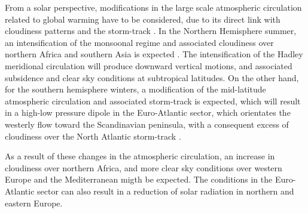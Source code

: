 From a solar perspective, modifications in the large scale atmospheric circulation related to global warming have to be considered, due to its direct link with cloudiness patterns and the storm-track \cite{Pozo-Vazquez2004, Chiacchio2010, Chiacchio2012}. In the Northern Hemisphere summer, an intensification of the monsoonal regime and associated cloudiness over northern Africa and southern Asia is expected \cite*{Gaetani2014}. The intensification of the Hadley meridional circulation  will produce downward vertical motions, and associated subsidence and clear sky conditions at subtropical latitudes. On the other hand, for the southern hemisphere winters, a modification of the mid-latitude atmospheric circulation and associated storm-track is expected, which will result in a high-low pressure dipole in the Euro-Atlantic sector, which orientates the westerly flow toward the Scandinavian peninsula, with a consequent excess of cloudiness over the North Atlantic storm-track \cite{Gaetani2014}.

As a result of these changes in the atmospheric circulation, an increase in cloudiness over northern Africa, and more clear sky conditions over western Europe and the Mediterranean \cite*{Gaetani2014} migth be expected. The conditions in the Euro-Atlantic sector can also result in a reduction of solar radiation in northern and eastern Europe.




